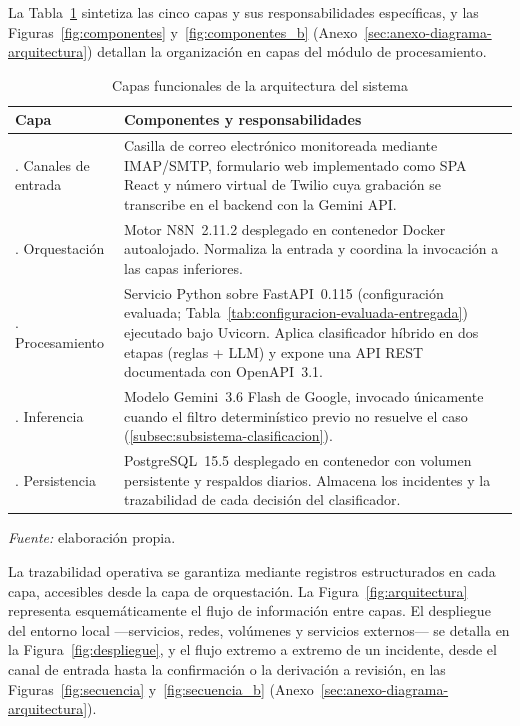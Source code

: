 La Tabla~\ref{tab:capas} sintetiza las cinco capas y sus responsabilidades específicas, y las Figuras~\ref{fig:componentes} y~\ref{fig:componentes_b} (Anexo~\ref{sec:anexo-diagrama-arquitectura}) detallan la organización en capas del módulo de procesamiento.

\begin{table}[htbp]
\centering
\caption{Capas funcionales de la arquitectura del sistema}
\label{tab:capas}
\small
\begin{tabular}{@{}>{\raggedright\arraybackslash}p{3.0cm} >{\raggedright\arraybackslash}p{10.5cm}@{}}
\toprule
\textbf{Capa} & \textbf{Componentes y responsabilidades} \\
\midrule
1. Canales de entrada & Casilla de correo electrónico monitoreada mediante IMAP/SMTP, formulario web implementado como SPA React y número virtual de Twilio cuya grabación se transcribe en el backend con la Gemini API. \\
2. Orquestación & Motor N8N~2.11.2 desplegado en contenedor Docker autoalojado. Normaliza la entrada y coordina la invocación a las capas inferiores. \\
3. Procesamiento & Servicio Python sobre FastAPI~0.115 (configuración evaluada; Tabla~\ref{tab:configuracion-evaluada-entregada}) ejecutado bajo Uvicorn. Aplica clasificador híbrido en dos etapas (reglas + LLM) y expone una API REST documentada con OpenAPI~3.1. \\
4. Inferencia & Modelo Gemini~3.6 Flash de Google, invocado únicamente cuando el filtro determinístico previo no resuelve el caso (\autoref{subsec:subsistema-clasificacion}). \\
5. Persistencia & PostgreSQL~15.5 desplegado en contenedor con volumen persistente y respaldos diarios. Almacena los incidentes y la trazabilidad de cada decisión del clasificador. \\
\bottomrule
\end{tabular}
\par\smallskip
{\footnotesize\textit{Fuente:} elaboración propia.\par}
\end{table}

La trazabilidad operativa se garantiza mediante registros estructurados en cada capa, accesibles desde la capa de orquestación. La Figura~\ref{fig:arquitectura} representa esquemáticamente el flujo de información entre capas. El despliegue del entorno local ---servicios, redes, volúmenes y servicios externos--- se detalla en la Figura~\ref{fig:despliegue}, y el flujo extremo a extremo de un incidente, desde el canal de entrada hasta la confirmación o la derivación a revisión, en las Figuras~\ref{fig:secuencia} y~\ref{fig:secuencia_b} (Anexo~\ref{sec:anexo-diagrama-arquitectura}).


